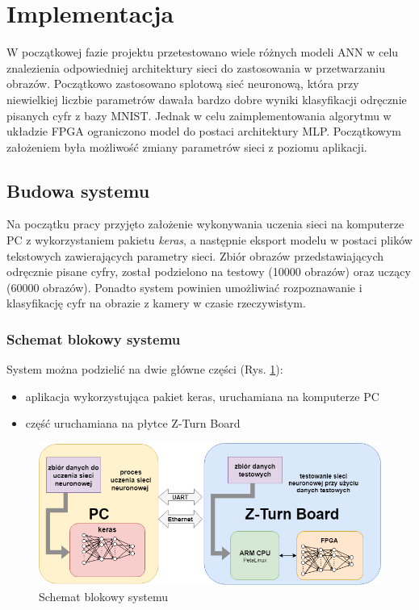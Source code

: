 \newpage %
\cleardoublepage %
\pagestyle{headings}

\section{Implementacja}
W początkowej fazie projektu przetestowano wiele różnych modeli ANN w celu znalezienia odpowiedniej architektury sieci do zastosowania w przetwarzaniu obrazów. Początkowo zastosowano splotową sieć neuronową, która przy niewielkiej liczbie parametrów dawała bardzo dobre wyniki klasyfikacji odręcznie pisanych cyfr z bazy MNIST. Jednak w celu zaimplementowania algorytmu w układzie FPGA ograniczono model do postaci architektury MLP. Początkowym założeniem była możliwość zmiany parametrów sieci z poziomu aplikacji.

\subsection{Budowa systemu}

Na początku pracy przyjęto założenie wykonywania uczenia sieci na komputerze PC z wykorzystaniem pakietu \emph{keras}, a następnie eksport modelu w postaci plików tekstowych zawierających parametry sieci. Zbiór obrazów przedstawiających odręcznie pisane cyfry, został podzielono na testowy (10000 obrazów) oraz uczący (60000 obrazów). Ponadto system powinien umożliwiać rozpoznawanie i klasyfikację cyfr na obrazie z kamery w czasie rzeczywistym.

\subsubsection{Schemat blokowy systemu}

System można podzielić na dwie główne części (Rys. \ref{schemat_blokowy}):
\begin{itemize}
  \item aplikacja wykorzystująca pakiet keras, uruchamiana na komputerze PC
  \item część uruchamiana na płytce Z-Turn Board
\end{itemize}

\begin{figure}[!h]
  \centering
  \includegraphics[width=\textwidth]{img/schemat_blokowy.png}
  \caption{Schemat blokowy systemu}
  \label{schemat_blokowy}
\end{figure}


